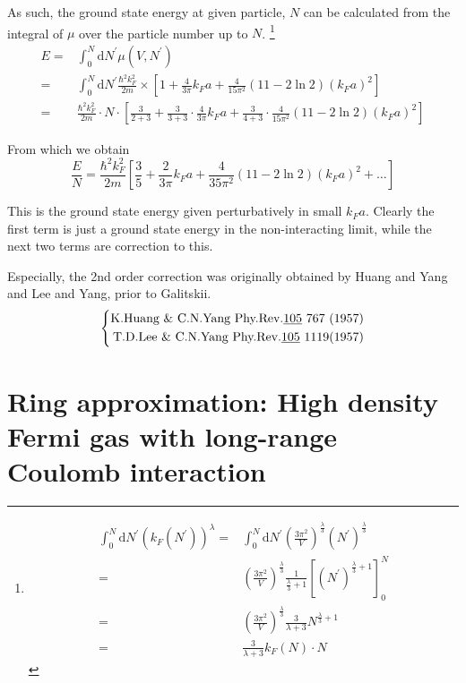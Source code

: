 As such, the ground state energy at given particle, $N$ can be calculated from the integral of $\mu$ over the particle number up to $N$.
\footnote{ \[ \begin{split} \int_0^N \mathrm{d}N^{'}(k_F(N^{'}))^\lambda =& \int_0^N \mathrm{d}N^{'}\left( \frac{3\pi^2}{V} \right)^{\frac{\lambda}{3}}(N^{'})^{\frac{\lambda}{3}}\\
=& \left( \frac{3\pi^2}{V} \right)^{\frac{\lambda}{3}} \frac{1}{\frac{\lambda}{3}+1}\left[ (N^{'})^{\frac{\lambda}{3}+1} \right]_0^N\\
=&\left( \frac{3\pi^2}{V} \right)^{\frac{\lambda}{3}} \frac{3}{\lambda+3}N^{\frac{\lambda}{3}+1}\\
=&\frac{3}{\lambda +3} k_F(N) \cdot N
\end{split} \]}
\[ \begin{split}
E=& \int_0^N \mathrm{d}N^{'} \mu(V,N^{'})\\
=&\int_0^N \mathrm{d}N^{'}\frac{\hbar^2 k_F^2}{2m} \times \left[ 1+\frac{4}{3\pi}k_F a + \frac{4}{15\pi^2}(11-2 \ln2)(k_F a)^2 \right]\\
=&\frac{\hbar^2 k_F^2}{2m}\cdot N\cdot \left[ \frac{3}{2+3} + \frac{3}{3+3}\cdot\frac{4}{3\pi}k_F a + \frac{3}{4+3}\cdot\frac{4}{15\pi^2}(11-2 \ln2)(k_F a)^2 \right]
\end{split}\]

From which we obtain
\begin{equation} \label{Eqs2.7.41}
\frac{E}{N} = \frac{\hbar^2 k_F^2}{2m}\left[ \frac{3}{5}+\frac{2}{3\pi}k_F a + \frac{4}{35\pi^2}(11-2 \ln2)(k_F a)^2 + \ldots \right]
\end{equation}

This is the ground state energy given perturbatively in small $k_F a$. Clearly the first term is just a ground state energy in the non-interacting limit, while the next two terms are correction to this.

Especially, the 2nd order correction was originally obtained by Huang and Yang and Lee and Yang, prior to Galitskii.
\[ \left\{ \begin{split}
\text{K.Huang \& C.N.Yang Phy.Rev.\underline{105} 767 (1957)}\\
\text{T.D.Lee \& C.N.Yang Phy.Rev.\underline{105} 1119(1957)}
\end{split} \right. \]

\section{Ring approximation: High density Fermi gas with long-range Coulomb interaction}%

